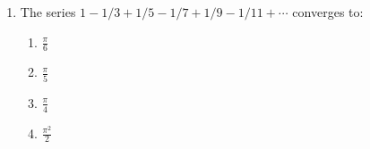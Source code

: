 \documentclass[letterpaper, 12pt]{amsart}
\begin{document}
\begin{enumerate}[leftmargin=*,itemsep=0.5cm]
 \item The series $1-1/3+1/5-1/7+1/9-1/11+\cdots$ converges to:\newline
        [Hint: Start playing around with 
               $\frac{1}{1-x}=\sum_{n=0}^\infty x^n$.] 
 
 \vspace*{0.15cm}
 \begin{enumerate}[itemsep=0.15cm]
   \item $\frac{\pi}{6}$
   \item $\frac{\pi}{5}$
   \item $\frac{\pi}{4}$
   \item $\frac{\pi^2}{2}$
  \end{enumerate}
\end{enumerate}
\end{document}
